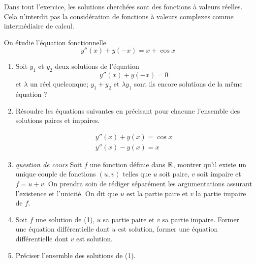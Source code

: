 Dans tout l'exercice, les solutions cherchées sont des fonctions à valeurs réelles. Cela n'interdit pas la considération de fonctions à valeurs complexes comme intermédiaire de calcul.

On étudie l'équation fonctionnelle
\begin{equation}
y''(x)+y(-x)=x+\cos x
\end{equation}

\begin{enumerate}
\item Soit $y_1$ et $y_2$ deux solutions de l'équation
\[y''(x)+y(-x)=0\]
et $\lambda$ un réel quelconque; $y_1+y_2$ et $\lambda y_1$ sont ils encore solutions de la même équation ?

\item Résoudre les équations suivantes en précisant pour chacune l'ensemble des solutions paires et impaires.

\begin{eqnarray}
y''(x)+y(x) = \cos x \\
y''(x)-y(x) = x
\end{eqnarray}

\item \emph{question de cours}\newline
Soit $f$ une fonction définie dans $\mathbb{R}$, montrer qu'il existe un unique couple de fonctions $(u,v)$ telles que $u$ soit paire, $v$ soit impaire et $f=u+v$. On prendra soin de rédiger séparément les argumentations assurant l'existence et l'unicité. On dit que $u$ est la partie paire et $v$ la partie impaire de $f$.

\item Soit $f$ une solution de (1), $u$ sa partie paire et $v$ sa partie impaire. Former une équation différentielle dont $u$ est solution, former une équation différentielle dont $v$ est solution.

\item Préciser l'ensemble des solutions de (1).
\end{enumerate}
